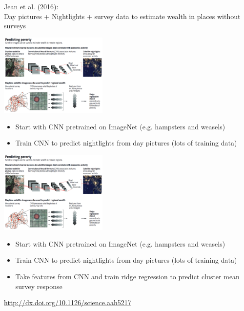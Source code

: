 \documentclass[aspectratio=169]{beamer}
\begin{document}
\begin{frame}

Jean et al. (2016):\\
Day pictures + Nightlights + survey data to estimate wealth in places without surveys

\end{frame}
\begin{frame}

\begin{center}
\includegraphics[width=0.4\textwidth]{figures/blumenstock_fighting_2016_fig}
\end{center}

\begin{itemize}
\item Start with CNN pretrained on ImageNet (e.g. hampsters and weasels)
\pause
\item Train CNN to predict nightlights from day pictures (lots of training data)
\end{itemize}

\end{frame}
\begin{frame}

\begin{center}
\includegraphics[width=0.4\textwidth]{figures/blumenstock_fighting_2016_fig}
\end{center}

\begin{itemize}
\item Start with CNN pretrained on ImageNet (e.g. hampsters and weasels)
\item Train CNN to predict nightlights from day pictures (lots of training data)
\item Take features from CNN and train ridge regression to predict cluster mean survey response
\end{itemize}

\vfill

\url{http://dx.doi.org/10.1126/science.aah5217}
\end{frame}
\end{document}
